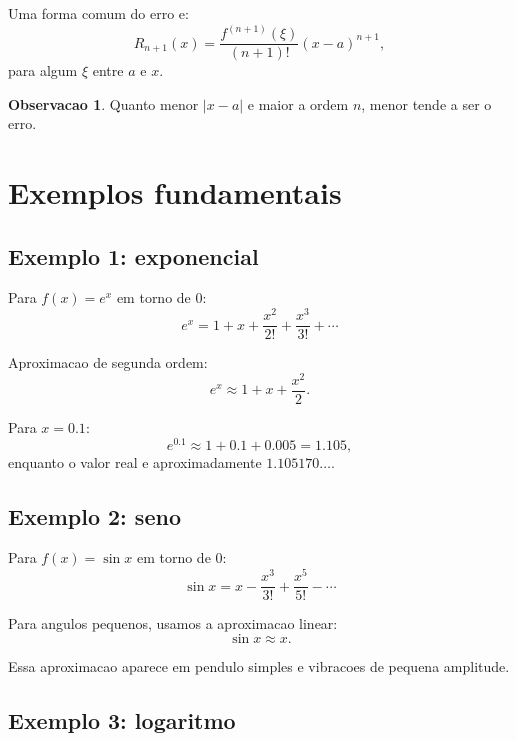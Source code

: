 \documentclass[12pt,a4paper,oneside]{book}
\theoremstyle{definition}
\newtheorem{remark}[definition]{Observacao}
\begin{document}
Uma forma comum do erro e:
\begin{equation}
R_{n+1}(x)=\frac{f^{(n+1)}(\xi)}{(n+1)!}(x-a)^{n+1},
\end{equation}
para algum $\xi$ entre $a$ e $x$.

\begin{remark}
Quanto menor $|x-a|$ e maior a ordem $n$, menor tende a ser o erro.
\end{remark}

\section{Exemplos fundamentais}

\subsection{Exemplo 1: exponencial}

Para $f(x)=e^x$ em torno de $0$:
\begin{equation}
e^x = 1 + x + \frac{x^2}{2!} + \frac{x^3}{3!} + \cdots
\end{equation}

Aproximacao de segunda ordem:
\begin{equation}
e^x \approx 1 + x + \frac{x^2}{2}.
\end{equation}

Para $x=0.1$:
\begin{equation}
e^{0.1} \approx 1 + 0.1 + 0.005 = 1.105,
\end{equation}
enquanto o valor real e aproximadamente $1.105170\ldots$.

\subsection{Exemplo 2: seno}

Para $f(x)=\sin x$ em torno de $0$:
\begin{equation}
\sin x = x - \frac{x^3}{3!} + \frac{x^5}{5!} - \cdots
\end{equation}

Para angulos pequenos, usamos a aproximacao linear:
\begin{equation}
\sin x \approx x.
\end{equation}

Essa aproximacao aparece em pendulo simples e vibracoes de pequena amplitude.

\subsection{Exemplo 3: logaritmo}
\end{document}
